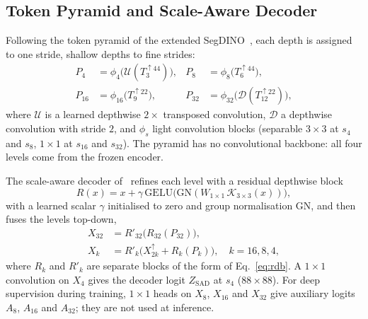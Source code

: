 \documentclass{ieeeaccess}
\begin{document}
\subsection{Token Pyramid and Scale-Aware Decoder}
\label{sec:decoder}
Following the token pyramid of the extended SegDINO~\cite{yang2026segdino}, each depth is assigned to one stride, shallow depths to fine strides:
\begin{equation}
\begin{aligned}
  P_4 &= \phi_4\bigl(\mathcal{U}(T_3^{\uparrow44})\bigr), & P_8 &= \phi_8\bigl(T_6^{\uparrow44}\bigr),\\
  P_{16} &= \phi_{16}\bigl(T_9^{\uparrow22}\bigr), & P_{32} &= \phi_{32}\bigl(\mathcal{D}(T_{12}^{\uparrow22})\bigr),
\end{aligned}
  \label{eq:pyramid}
\end{equation}
where $\mathcal{U}$ is a learned depthwise $2\times$ transposed convolution, $\mathcal{D}$ a depthwise convolution with stride $2$, and $\phi_s$ light convolution blocks (separable $3\times3$ at $s_4$ and $s_8$, $1\times1$ at $s_{16}$ and $s_{32}$). The pyramid has no convolutional backbone: all four levels come from the frozen encoder.

The scale-aware decoder of~\cite{yang2026segdino} refines each level with a residual depthwise block
\begin{equation}
  R(x)=x+\gamma\,\mathrm{GELU}\bigl(\mathrm{GN}(W_{1\times1}\,\mathcal{K}_{3\times3}(x))\bigr),
  \label{eq:rdb}
\end{equation}
with a learned scalar $\gamma$ initialised to zero and group normalisation $\mathrm{GN}$, and then fuses the levels top-down,
\begin{equation}
\begin{aligned}
  X_{32}&=R'_{32}\bigl(R_{32}(P_{32})\bigr),\\
  X_k&=R'_k\bigl(X_{2k}^{\uparrow}+R_k(P_k)\bigr),\quad k=16,8,4,
\end{aligned}
  \label{eq:topdown}
\end{equation}
where $R_k$ and $R'_k$ are separate blocks of the form of Eq.~\eqref{eq:rdb}. A $1\times1$ convolution on $X_4$ gives the decoder logit $Z_{\text{SAD}}$ at $s_4$ ($88\times88$). For deep supervision during training, $1\times1$ heads on $X_8$, $X_{16}$ and $X_{32}$ give auxiliary logits $A_8$, $A_{16}$ and $A_{32}$; they are not used at inference.
\end{document}
